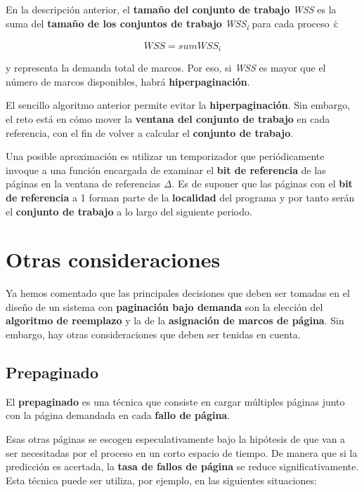 En la descripción anterior, el \textbf{tamaño del conjunto de trabajo}
\emph{WSS} es la suma del \textbf{tamaño de los conjuntos de trabajo}
\emph{WSS\textsubscript{i}} para cada proceso \emph{i}:

\[WSS=sum WSS_i\]

y representa la demanda total de marcos. Por eso, si \emph{WSS} es mayor
que el número de marcos disponibles, habrá \textbf{hiperpaginación}.

El sencillo algoritmo anterior permite evitar la
\textbf{hiperpaginación}. Sin embargo, el reto está en cómo mover la
\textbf{ventana del conjunto de trabajo} en cada referencia, con el fin
de volver a calcular el \textbf{conjunto de trabajo}.

Una posible aproximación es utilizar un temporizador que periódicamente
invoque a una función encargada de examinar el \textbf{bit de
referencia} de las páginas en la ventana de referencias \emph{Δ}. Es de
suponer que las páginas con el \textbf{bit de referencia} a 1 forman
parte de la \textbf{localidad} del programa y por tanto serán el
\textbf{conjunto de trabajo} a lo largo del siguiente periodo.

\section{Otras consideraciones}\label{_otras_consideraciones}

Ya hemos comentado que las principales decisiones que deben ser tomadas
en el diseño de un sistema con \textbf{paginación bajo demanda} son la
elección del \textbf{algoritmo de reemplazo} y la de la
\textbf{asignación de marcos de página}. Sin embargo, hay otras
consideraciones que deben ser tenidas en cuenta.

\subsection{Prepaginado}\label{_prepaginado}

El \textbf{{}prepaginado} es una técnica que consiste en cargar
múltiples páginas junto con la página demandada en cada \textbf{fallo de
página}.

Esas otras páginas se escogen especulativamente bajo la hipótesis de que
van a ser necesitadas por el proceso en un corto espacio de tiempo. De
manera que si la predicción es acertada, la \textbf{tasa de fallos de
página} se reduce significativamente. Esta técnica puede ser utiliza,
por ejemplo, en las siguientes situaciones:

